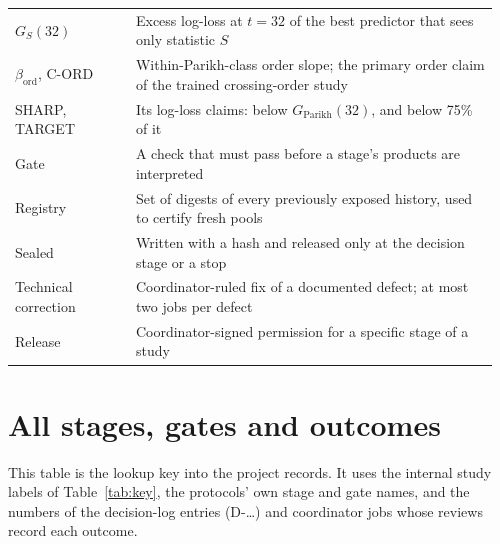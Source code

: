 \documentclass[11pt,a4paper]{article}
\DeclareRobustCommand{\_}{\ifmmode\origunderscore\else\textunderscore\allowbreak\fi}
\begin{document}
\begin{longtable}{@{}L{0.24\linewidth}L{0.72\linewidth}@{}}
$G_S(32)$ & Excess log-loss at $t=32$ of the best predictor that sees only statistic $S$\\
$\beta_{\mathrm{ord}}$, C-ORD & Within-Parikh-class order slope; the primary order claim of the trained crossing-order study\\
SHARP, TARGET & Its log-loss claims: below $G_{\mathrm{Parikh}}(32)$, and below 75\% of it\\
Gate & A check that must pass before a stage's products are interpreted\\
Registry & Set of digests of every previously exposed history, used to certify fresh pools\\
Sealed & Written with a hash and released only at the decision stage or a stop\\
Technical correction & Coordinator-ruled fix of a documented defect; at most two jobs per defect\\
Release & Coordinator-signed permission for a specific stage of a study\\
\bottomrule
\end{longtable}

\section{All stages, gates and outcomes}\label{app:table}
This table is the lookup key into the project records. It uses the internal study labels of
Table~\ref{tab:key}, the protocols' own stage and gate names, and the numbers of the
decision-log entries (D-\ldots) and coordinator jobs whose reviews record each outcome.
\end{document}
